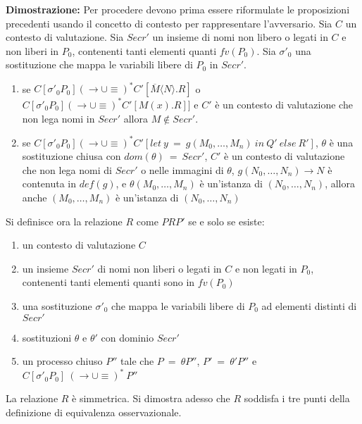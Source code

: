 \documentclass[12pt]{report}
\begin{document}
\textbf{Dimostrazione:} Per procedere devono prima essere riformulate le proposizioni precedenti usando il concetto di contesto per rappresentare l'avversario. Sia $C$ un contesto di valutazione. Sia $Secr'$ un insieme di nomi non libero o legati in $C$ e non liberi in $P_0$, contenenti tanti elementi quanti $fv(P_0)$. Sia $\sigma'_0$ una sostituzione che mappa le variabili libere di $P_0$ in $Secr'$.
\begin{enumerate}
    \item se $C[\sigma'_0 P_0] (\rightarrow \cup \equiv)^* C'[\overline{M} \langle N \rangle . R]$ o $C[\sigma'_0 P_0] (\rightarrow \cup \equiv)^* C'[M(x).R]]$ e $C'$ è un contesto di valutazione che non lega nomi in $Secr'$ allora $M \notin Secr'$.
    \item se $C[\sigma'_0 P_0] (\rightarrow \cup \equiv)^* C'[let\ y\ =\ g(M_0,\dots,M_n)\ in\ Q'\ else\ R']$, $\theta$ è una sostituzione chiusa con $dom(\theta)\ =\ Secr'$, $C'$ è un contesto di valutazione che non lega nomi di $Secr'$ o nelle immagini di $\theta$, $g(N_0,\dots,N_n) \rightarrow N$ è contenuta in $def(g)$, e $\theta (M_0,\dots,M_n)$ è un'istanza di $(N_0,\dots,N_n)$, allora anche $(M_0,\dots,M_n)$ è un'istanza di $(N_0,\dots,N_n)$ 
\end{enumerate}
Si definisce ora la relazione $R$ come $PRP'$ se e solo se esiste:\\
\begin{enumerate}
    \item un contesto di valutazione $C$
    \item un insieme $Secr'$ di nomi non liberi o legati in $C$ e non legati in $P_0$, contenenti tanti elementi quanti sono in $fv(P_0)$
    \item una sostituzione $\sigma'_0$ che mappa le variabili libere di $P_0$ ad elementi distinti di $Secr'$
    \item sostituzioni $\theta$ e $\theta'$ con dominio $Secr'$
    \item un processo chiuso $P''$ tale che $P\ =\ \theta P''$, $P'\ =\ \theta'P''$ e\\ $C[\sigma'_0 P_0]\ (\rightarrow \cup \equiv)^*\ P''$  
\end{enumerate}
La relazione $R$ è simmetrica. Si dimostra adesso che $R$ soddisfa i tre punti della definizione di equivalenza osservazionale.\\
\end{document}

